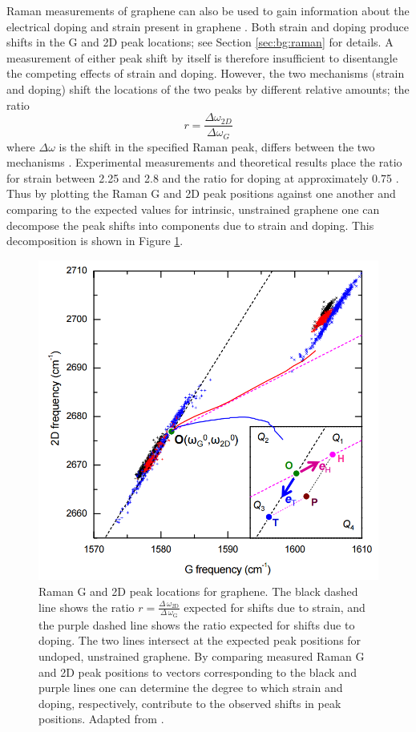 \documentclass[edeposit,fullpage,draftthesis]{uiucthesis2009}
\begin{document}
        Raman measurements of graphene can also be used to gain information about the electrical doping
        and strain present in graphene \cite{lee2012optical}. Both strain and doping produce shifts
        in the G and 2D peak locations; see Section \ref{sec:bg:raman} for details. 
        A measurement of either peak shift by itself is therefore insufficient to disentangle the competing effects
        of strain and doping. However, the two mechanisms (strain and doping) shift the locations of the two
        peaks by different relative amounts; the ratio
        $$
        r = \frac{\Delta \omega_{2D}}{\Delta \omega_G}
        $$
        where $\Delta \omega$ is the shift in the specified Raman peak, differs between the two mechanisms \cite{lee2012optical}.
        Experimental measurements \cite{zabel2012raman, metzger2009biaxial, ding2010stretchable} and theoretical \cite{mohr2010splitting, mohiuddin2009uniaxial} results place the ratio for strain between 2.25 and 2.8 and the ratio for doping at approximately 0.75 \cite{lee2012optical}.
        Thus by plotting the Raman G and 2D peak positions against one another and comparing to the expected
        values for intrinsic, unstrained graphene one can decompose the peak shifts into components due to
        strain and doping\cite{lee2012optical}. This decomposition is shown in Figure \ref{fig:raman_decomposition}.
        
        \begin{figure}
            \centering
            \includegraphics[width=0.5\linewidth]{images/experimentaltechniques/lee2012_raman.png}
            \caption[Graphene G vs 2D peak positions for strain and doping]{
                Raman G and 2D peak locations for graphene.
                The black dashed line shows the ratio 
                $r = \frac{\Delta \, \omega_\text{2D}}{\Delta \, \omega_\text{G}}$ expected for shifts due to
                strain, and the purple dashed line shows the ratio expected for shifts due to doping.
                The two lines intersect at the expected peak positions for undoped, unstrained graphene.
                By comparing measured Raman G and 2D peak positions to vectors corresponding to the
                black and purple lines one can determine the degree to which strain and doping, respectively,
                contribute to the observed shifts in peak positions.
                Adapted from \cite{lee2012optical}.
                }
            \label{fig:raman_decomposition}
        \end{figure}
        
\end{document}
